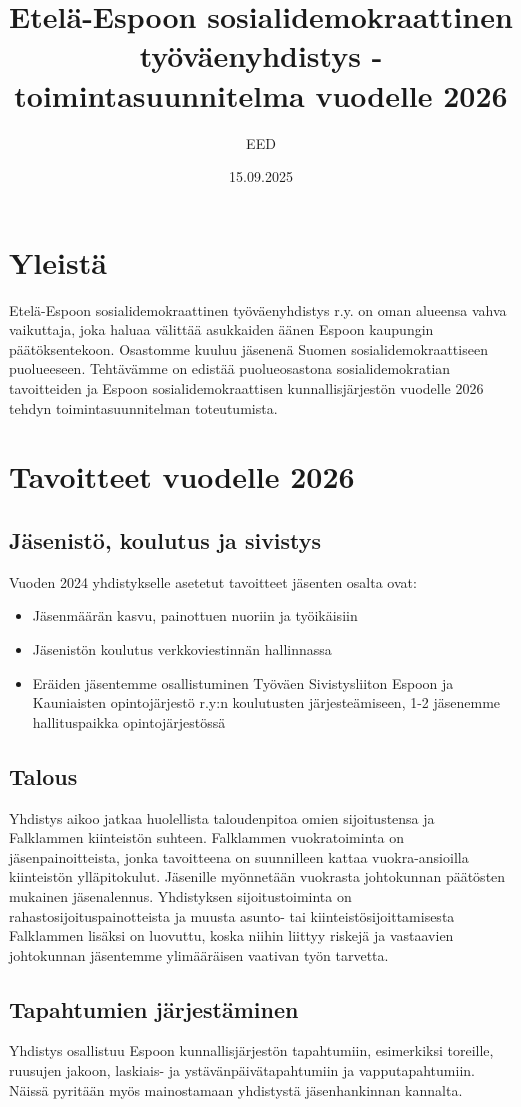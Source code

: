 \documentclass[a4paper,12pt]{article}
\title{Etelä-Espoon sosialidemokraattinen työväenyhdistys - toimintasuunnitelma vuodelle 2026}
\author{EED}
\date{15.09.2025}
\begin{document}
\maketitle
\section{Yleistä}
Etelä-Espoon sosialidemokraattinen työväenyhdistys r.y. on oman alueensa vahva vaikuttaja, joka haluaa välittää asukkaiden äänen Espoon kaupungin päätöksentekoon. Osastomme kuuluu jäsenenä Suomen sosialidemokraattiseen puolueeseen. Tehtävämme on edistää puolueosastona sosialidemokratian tavoitteiden ja Espoon sosialidemokraattisen kunnallisjärjestön vuodelle 2026 tehdyn toimintasuunnitelman toteutumista.
\section{Tavoitteet vuodelle 2026}
\subsection{Jäsenistö, koulutus ja sivistys}
Vuoden 2024 yhdistykselle asetetut tavoitteet jäsenten osalta ovat:
\begin{itemize}
\item{Jäsenmäärän kasvu, painottuen nuoriin ja työikäisiin}
\item{Jäsenistön koulutus verkkoviestinnän hallinnassa}
\item{Eräiden jäsentemme osallistuminen Työväen Sivistysliiton Espoon ja Kauniaisten opintojärjestö r.y:n koulutusten järjesteämiseen, 1-2 jäsenemme hallituspaikka opintojärjestössä}
\end{itemize}
\subsection{Talous}
Yhdistys aikoo jatkaa huolellista taloudenpitoa omien sijoitustensa ja Falklammen kiinteistön suhteen. Falklammen vuokratoiminta on jäsenpainoitteista, jonka tavoitteena on suunnilleen kattaa vuokra-ansioilla kiinteistön ylläpitokulut. Jäsenille myönnetään vuokrasta johtokunnan päätösten mukainen jäsenalennus. Yhdistyksen sijoitustoiminta on rahastosijoituspainotteista ja muusta asunto- tai kiinteistösijoittamisesta Falklammen lisäksi on luovuttu, koska niihin liittyy riskejä ja vastaavien johtokunnan jäsentemme ylimääräisen vaativan työn tarvetta.
\subsection{Tapahtumien järjestäminen}
Yhdistys osallistuu Espoon kunnallisjärjestön tapahtumiin, esimerkiksi toreille, ruusujen jakoon, laskiais- ja ystävänpäivätapahtumiin ja vapputapahtumiin. Näissä pyritään myös mainostamaan yhdistystä jäsenhankinnan kannalta.
\end{document}
